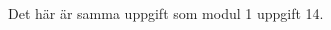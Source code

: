 \documentclass[../../main.tex]{subfiles}
\begin{document}
\begin{solution}{11} 

Det här är samma uppgift som modul 1 uppgift 14.

\end{solution}
\end{document}

